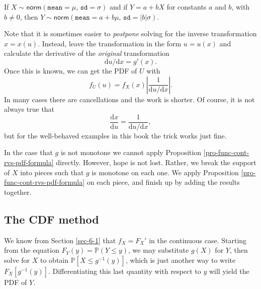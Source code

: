 \documentclass[captions=tableheading]{scrbook}
\begin{document}
\begin{fact}
If \(X\sim\mathsf{norm}(\mathtt{mean}=\mu,\,\mathtt{sd}=\sigma)\) and if \(Y=a+bX\) for constants \(a\) and \(b\), with \(b\neq0\), then \(Y\sim\mathsf{norm}(\mathtt{mean}=a+b\mu,\,\mathtt{sd}=|b|\sigma)\). 
\end{fact}

Note that it is sometimes easier to \emph{postpone} solving for the inverse transformation \(x=x(u)\). Instead, leave the transformation in the form \(u=u(x)\) and calculate the derivative of the \emph{original} transformation
\begin{equation}
\mathrm{d} u/\mathrm{d} x=g'(x).
\end{equation}
Once this is known, we can get the PDF of \(U\) with
\begin{equation}
f_{U}(u)=f_{X}(x)\left|\frac{1}{\mathrm{d} u/\mathrm{d} x}\right|.
\end{equation}
In many cases there are cancellations and the work is shorter. Of course, it is not always true that
\begin{equation}
\frac{\mathrm{d} x}{\mathrm{d} u}=\frac{1}{\mathrm{d} u/\mathrm{d} x},\label{eq-univ-jacob-recip}
\end{equation}
but for the well-behaved examples in this book the trick works just fine.

\begin{rem}
In the case that \(g\) is not monotone we cannot apply Proposition \ref{pro-func-cont-rvs-pdf-formula} directly. However, hope is not lost. Rather, we break the support of \(X\) into pieces such that \(g\) is monotone on each one. We apply Proposition \ref{pro-func-cont-rvs-pdf-formula} on each piece, and finish up by adding the results together.
\end{rem}
\subsection{The CDF method}
\label{sec-6-4-2}


We know from Section \ref{sec-6-1} that \(f_{X}=F_{X}'\) in the continuous case. Starting from the equation \(F_{Y}(y)=\mathbb{P}(Y\leq y)\), we may substitute \(g(X)\) for \(Y\), then solve for \(X\) to obtain \(\mathbb{P}[X\leq g^{-1}(y)]\), which is just another way to write \(F_{X}[g^{-1}(y)]\). Differentiating this last quantity with respect to \(y\) will yield the PDF of \(Y\).
\end{document}
